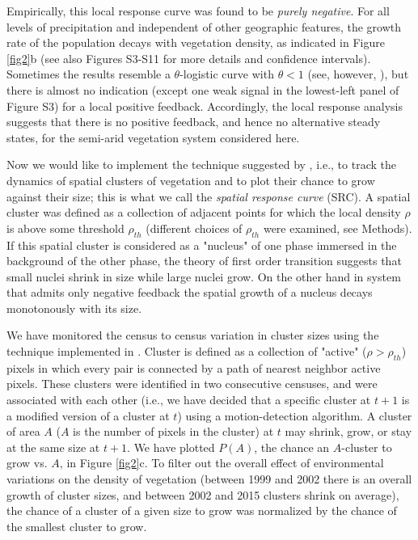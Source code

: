 \documentclass[aps,pre,twocolumn]{revtex4-1}
\begin{document}
Empirically, this local response curve was found to be \emph{purely negative}.  For all levels of precipitation and independent of other geographic features, the growth rate of the population decays  with vegetation density, as indicated in Figure \ref{fig2}b (see also Figures S3-S11 for more details and confidence intervals). Sometimes the results resemble a $\theta$-logistic curve with $\theta<1$ (see, however, \cite{clark2010theta}),  but there is almost no indication (except one weak signal in the lowest-left panel of Figure S3) for a local positive feedback. Accordingly, the local response analysis suggests that there is no positive feedback, and hence no alternative steady states, for the semi-arid vegetation system considered here.

Now we would like to implement the technique suggested by \cite{weissmann2016predicting}, i.e., to track the dynamics of spatial clusters of vegetation and to plot their chance to grow against their size; this is what we call the \emph{spatial response curve} (SRC).  A spatial cluster was defined as a collection of adjacent points for which the local density $\rho$ is above some threshold $\rho_{th}$ (different choices of $\rho_{th}$ were examined, see Methods). If this spatial cluster is considered as a "nucleus" of one phase immersed in the background of the other phase, the theory of first order transition suggests that small nuclei shrink in size while large nuclei grow. On the other hand in system that admits only negative feedback the spatial growth of a nucleus decays monotonously with its size.

We have monitored the census to census variation in cluster sizes using the technique implemented in \cite{seri2012neutral,weissmann2016predicting}. Cluster is defined as  a collection of "active" ($\rho > \rho_{th}$) pixels in which every pair is connected by a path of nearest neighbor active pixels.  These clusters were identified in two consecutive censuses, and were associated with each other (i.e., we have decided that a specific cluster at $t+1$ is a modified version of a cluster at $t$) using a motion-detection algorithm. A cluster  of area $A$ ($A$ is the number of pixels in the cluster) at $t$ may shrink, grow, or stay at the same size at $t+1$. We have plotted $P(A)$, the chance an $A$-cluster to grow vs. $A$, in  Figure \ref{fig2}c. To filter out the  overall effect of environmental variations on the density of vegetation (between 1999 and 2002 there is an overall growth of cluster sizes, and between 2002 and 2015 clusters shrink on average), the chance of a cluster of a given size to grow was normalized by the chance of the smallest cluster to grow.
\end{document}
